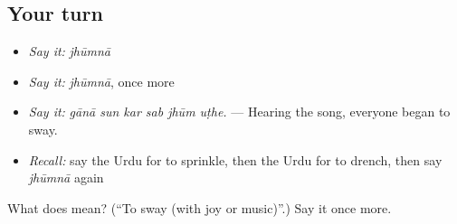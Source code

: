 \subsection*{Your turn}
\begin{itemize}
\raggedright
  \item \emph{Say it:} \emph{jhūmnā}
  \item \emph{Say it:} \emph{jhūmnā}, once more
  \item \emph{Say it:} \emph{gānā sun kar sab jhūm uṭhe.} — Hearing the song, everyone began to sway.
  \item \emph{Recall:} say the Urdu for to sprinkle, then the Urdu for to drench, then say \emph{jhūmnā} again
\end{itemize}

\begin{tcolorbox}[breakable,colback=teal!4,colframe=teal!35!black,title={Before you move on}]
What does  mean? (\textquotedblleft{}To sway (with joy or music)\textquotedblright{}.) Say it once more.
\end{tcolorbox}
